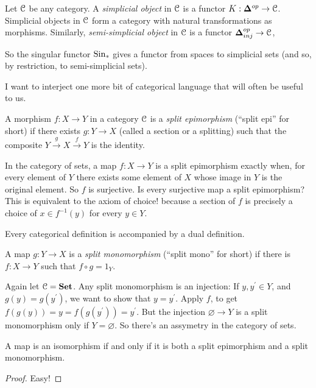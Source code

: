 \begin{definition} Let $\mathcal C$ be any category. A {\em simplicial object} in $\mathcal C$ is a functor $K:{\mathbf{\Delta}}^{op}\to\mathcal C$. Simplicial objects in $\mathcal C$ form a category with natural transformations as morphisms. Similarly, {\em semi-simplicial object} in $\mathcal C$ is a functor ${\mathbf{\Delta}}_{inj}^{op}\to\mathcal C$,
\end{definition}

So the singular functor $\mathrm{Sin}_\ast$ gives a functor from spaces to simplicial sets (and so, by restriction, to semi-simplicial sets). 

I want to interject one more bit of categorical language that will often be useful to us. 

\begin{definition}
A morphism $f:X\to Y$ in a category $\mathcal C$ is a \textit{split epimorphism} (``split epi'' for short) if there exists $g:Y\to X$ (called a section or a splitting) such that the composite $Y\xrightarrow{g}X\xrightarrow{f}Y$ is the identity.
\end{definition}
\begin{example}
In the category of sets, a map $f:X\to Y$ is a split epimorphism exactly when, 
for every element of $Y$ there exists some element of $X$ whose image in $Y$ is the original element. So $f$ is surjective. Is every surjective map a split epimorphism? This is equivalent to the axiom of choice! because a section of $f$ is precisely a choice of $x\in f^{-1}(y)$ for every $y\in Y$.
\end{example}
Every categorical definition is accompanied by a dual definition. 
\begin{definition}
A map $g:Y\to X$ is a {\em split monomorphism} (``split mono'' for short) if there is $f:X\to Y$ such that $f\circ g=1_Y$.
\end{definition}
\begin{example}
Again let $\mathcal C=\mathbf{Set}$. Any split monomorphism is an injection: If $y,y^\prime\in Y$, and $g(y)=g(y^\prime)$, we want to show that $y=y^\prime$. Apply $f$, to get $f(g(y))=y=f(g(y^\prime))=y^\prime$. But the injection $\varnothing\to Y$ 
is a split monomorphism only if $Y=\varnothing$. So there's an assymetry 
in the category of sets.
\end{example}
\begin{lemma}
A map is an isomorphism if and only if it is both a split epimorphism and a
split monomorphism.
\end{lemma}
\begin{proof}
Easy!
\end{proof}
